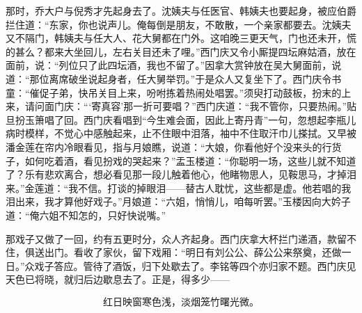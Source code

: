 那时，乔大户与倪秀才先起身去了。沈姨夫与任医官、韩姨夫也要起身，被应伯爵拦住道：“东家，你也说声儿。俺每倒是朋友，不敢散，一个亲家都要去。沈姨夫又不隔门，韩姨夫与任大人、花大舅都在门外。这咱晚三更天气，门也还未开，慌的甚么？都来大坐回儿，左右关目还未了哩。”西门庆又令小厮提四坛麻姑酒，放在面前，说：“列位只了此四坛酒，我也不留了。”因拿大赏钟放在吴大舅面前，说道：“那位离席破坐说起身者，任大舅举罚。”于是众人又复坐下了。西门庆令书童：“催促子弟，快吊关目上来，吩咐拣着热闹处唱罢。”须臾打动鼓板，扮末的上来，请问面门庆：“‘寄真容’那一折可要唱？”西门庆道：“我不管你，只要热闹。”贴旦扮玉箫唱了回。西门庆看唱到“今生难会面，因此上寄丹青”一句，忽想起李瓶儿病时模样，不觉心中感触起来，止不住眼中泪落，袖中不住取汗巾儿搽拭。又早被潘金莲在帘内冷眼看见，指与月娘瞧，说道：“大娘，你看他好个没来头的行货子，如何吃着酒，看见扮戏的哭起来？”盂玉楼道：“你聪明一场，这些儿就不知道了？乐有悲欢离合，想必看见那一段儿触着他心，他睹物思人，见鞍思马，才掉泪来。”金莲道：“我不信。打谈的掉眼泪——替古人耽忧，这些都是虚。他若唱的我泪出来，我才算他好戏子。”月娘道：“六姐，悄悄儿，咱每听罢。”玉楼因向大妗子道：“俺六姐不知怎的，只好快说嘴。”

那戏子又做了一回，约有五更时分，众人齐起身。西门庆拿大杯拦门递酒，款留不住，俱送出门。看收了家伙，留下戏厢：“明日有刘公公、薛公公来祭奠，还做一日。”众戏子答应。管待了酒饭，归下处歇去了。李铭等四个亦归家不题。西门庆见天色已将晓，就归后边歇息去了。正是，得多少——

\[
红日映窗寒色浅，淡烟笼竹曙光微。
\]

